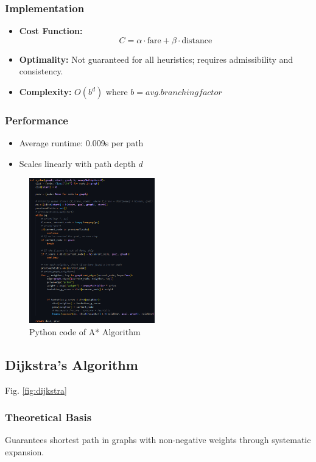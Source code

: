 \documentclass[conference]{IEEEtran}
\begin{document}
\subsubsection{Implementation}
\begin{itemize}
    \item \textbf{Cost Function:}
    \[
    C = \alpha \cdot \text{fare} + \beta \cdot \text{distance}
    \]
    \item \textbf{Optimality:} Not guaranteed for all heuristics; requires admissibility and consistency.
    \item \textbf{Complexity:} $O(b^d)$ where $b=avg. branching factor$
\end{itemize}

\subsubsection{Performance}
\begin{itemize}
    \item Average runtime: 0.009s per path
    \item Scales linearly with path depth $d$
\end{itemize}

\begin{figure}[htbp]
    \centering
    \includegraphics[width=0.486\textwidth]{astar.png} %
    \caption{Python code of A* Algorithm}
    \label{fig:astar}
\end{figure}

\subsection{Dijkstra's Algorithm}
Fig. \ref{fig:dijkstra}
\subsubsection{Theoretical Basis}
Guarantees shortest path in graphs with non-negative weights through systematic expansion.
\end{document}
